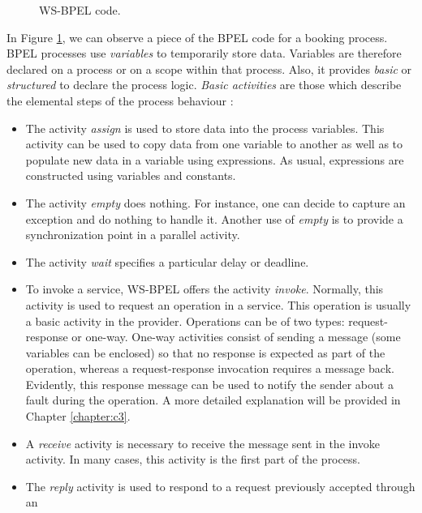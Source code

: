 \begin{figure}[h]
\begin{center}
\end{center}
\caption{WS-BPEL code.}
\label{bpelcode}
\end{figure}

In Figure \ref{bpelcode}, we can observe a piece of the BPEL code for a booking process. 
BPEL processes use {\em variables} to temporarily store 
data. Variables are therefore declared on a process or on a scope 
within that process. Also, 
it provides \emph{basic} or \emph{structured} to declare the process logic. 
\emph{Basic activities} are those which describe the elemental 
steps of the process behaviour \cite{wsbpelstandard}: 
\begin{itemize}
\item The activity \emph{assign} is used to store data into the process variables. 
This activity can be used to copy data from one variable to another as well as to
populate new data in a variable using expressions. As usual, expressions are constructed using 
variables and constants. 
\item The activity \emph{empty} does nothing. For instance, one can
decide to capture an exception and do nothing to handle it. Another use of \emph{empty} is
to provide a synchronization point in a parallel activity.
\item The activity \emph{wait} specifies a particular delay or deadline. 
\item To invoke a service, WS-BPEL offers the activity {\em invoke}. 
Normally, this activity is used to request an operation in a service. This operation is usually 
a basic activity in the provider. Operations can be of two types: request-response or one-way.
One-way activities consist of sending a message (some variables can be enclosed) so that no response is expected
as part of the operation, whereas a request-response invocation requires a message back. Evidently, this
response message can be used to notify the sender about a fault during the operation. A more detailed
explanation will be provided in Chapter \ref{chapter:c3}. 
\item A \emph{receive} activity is necessary to receive the message sent in the invoke activity.
In many cases, this activity is the first part of the process.
\item The \emph{reply} activity is used to respond to a request previously accepted through an

\end{itemize}
